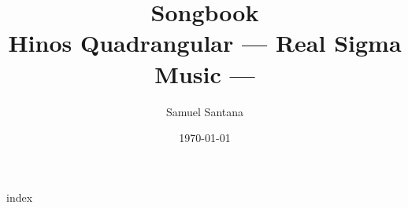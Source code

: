 



\title{\rmfamily\bfseries\Huge Songbook \\ Hinos Quadrangular 
    \vfill
    \sffamily\small --- Real Sigma Music ---}
\author{\sffamily\small Samuel Santana}
\date{\sffamily\small\today}

\maketitle

\thispagestyle{empty}
\cleardoublepage


\begin{songs}{index}

 \brk
 \brk
 \brk
 \brk

\end{songs}

\newpage
\thispagestyle{empty}
\null
\newpage


